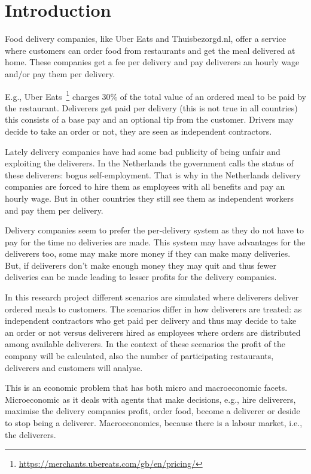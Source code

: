 
\section{Introduction}

Food delivery companies, like Uber Eats and Thuisbezorgd.nl, offer a service where customers can order food from restaurants and get the meal delivered at home.
These companies get a fee per delivery and pay deliverers an hourly wage and/or pay them per delivery.

E.g., Uber Eats~\footnote{\url{https://merchants.ubereats.com/gb/en/pricing/}} charges 30\% of the total value of an ordered meal to be paid by the restaurant.
Deliverers get paid per delivery (this is not true in all countries) this consists of a base pay and an optional tip from the customer.
Drivers may decide to take an order or not, they are seen as independent contractors.

Lately delivery companies have had some bad publicity of being unfair and exploiting the deliverers.
In the Netherlands the government calls the status of these deliverers: bogus self-employment.
That is why in the Netherlands delivery companies are forced to hire them as employees with all benefits and pay an hourly wage.
But in other countries they still see them as independent workers and pay them per delivery.

Delivery companies seem to prefer the per-delivery system as they do not have to pay for the time no deliveries are made.
This system may have advantages for the deliverers too, some may make more money if they can make many deliveries.
But, if deliverers don't make enough money they may quit and thus fewer deliveries can be made leading to lesser profits for the delivery companies.

In this research project different scenarios are simulated where deliverers deliver ordered meals to customers.
The scenarios differ in how deliverers are treated: as independent contractors who get paid per delivery and thus may decide to take an order or not versus
deliverers hired as employees where orders are distributed among available deliverers.
In the context of these scenarios the profit of the company will be calculated, also the number of participating restaurants, deliverers and customers will analyse.

This is an economic problem that has both micro and macroeconomic facets.
Microeconomic as it deals with agents that make decisions, e.g., hire deliverers, maximise the delivery companies profit, order food, become a deliverer or deside to stop being a deliverer.
Macroeconomics, because there is a labour market, i.e., the deliverers.

